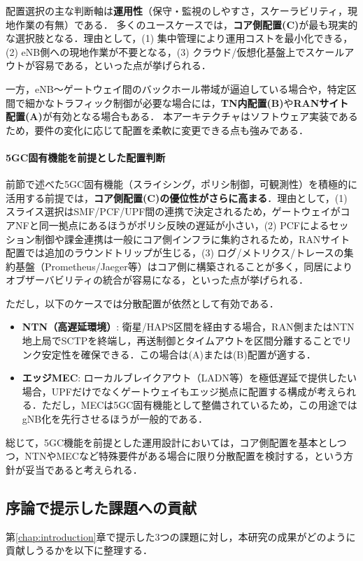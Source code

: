配置選択の主な判断軸は\textbf{運用性}（保守・監視のしやすさ，スケーラビリティ，現地作業の有無）である．
多くのユースケースでは，\textbf{コア側配置(C)}が最も現実的な選択肢となる．理由として，(1) 集中管理により運用コストを最小化できる，(2) eNB側への現地作業が不要となる，(3) クラウド/仮想化基盤上でスケールアウトが容易である，といった点が挙げられる．

一方，eNB〜ゲートウェイ間のバックホール帯域が逼迫している場合や，特定区間で細かなトラフィック制御が必要な場合には，\textbf{TN内配置(B)}や\textbf{RANサイト配置(A)}が有効となる場合もある．
本アーキテクチャはソフトウェア実装であるため，要件の変化に応じて配置を柔軟に変更できる点も強みである．

\paragraph{5GC固有機能を前提とした配置判断}
前節で述べた5GC固有機能（スライシング，ポリシ制御，可観測性）を積極的に活用する前提では，\textbf{コア側配置(C)の優位性がさらに高まる}．理由として，(1) スライス選択はSMF/PCF/UPF間の連携で決定されるため，ゲートウェイがコアNFと同一拠点にあるほうがポリシ反映の遅延が小さい，(2) PCFによるセッション制御や課金連携は一般にコア側インフラに集約されるため，RANサイト配置では追加のラウンドトリップが生じる，(3) ログ/メトリクス/トレースの集約基盤（Prometheus/Jaeger等）はコア側に構築されることが多く，同居によりオブザーバビリティの統合が容易になる，といった点が挙げられる．

ただし，以下のケースでは分散配置が依然として有効である．
\begin{itemize}
    \item \textbf{NTN（高遅延環境）}: 衛星/HAPS区間を経由する場合，RAN側またはNTN地上局でSCTPを終端し，再送制御とタイムアウトを区間分離することでリンク安定性を確保できる．この場合は(A)または(B)配置が適する．
    \item \textbf{エッジMEC}: ローカルブレイクアウト（LADN等）を極低遅延で提供したい場合，UPFだけでなくゲートウェイもエッジ拠点に配置する構成が考えられる．ただし，MECは5GC固有機能として整備されているため，この用途ではgNB化を先行させるほうが一般的である．
\end{itemize}

総じて，5GC機能を前提とした運用設計においては，コア側配置を基本としつつ，NTNやMECなど特殊要件がある場合に限り分散配置を検討する，という方針が妥当であると考えられる．

\subsection{序論で提示した課題への貢献}
第\ref{chap:introduction}章で提示した3つの課題に対し，本研究の成果がどのように貢献しうるかを以下に整理する．

